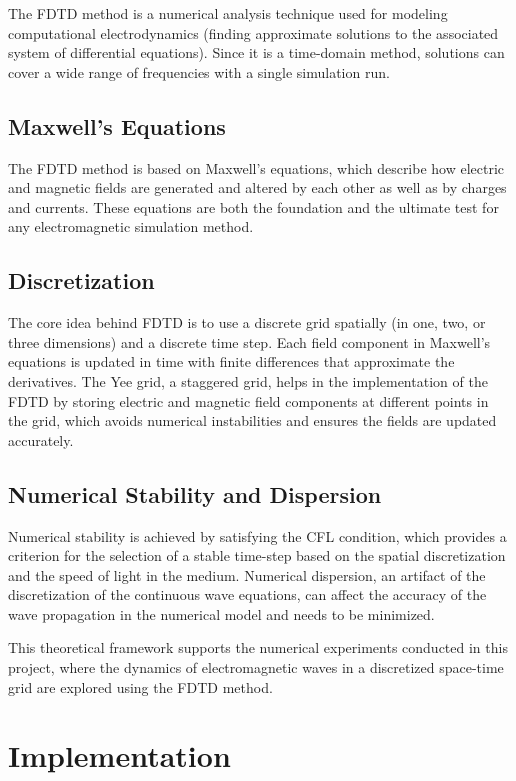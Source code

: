\documentclass{article}[a4paper]
\begin{document}
The FDTD method is a numerical analysis technique used for modeling computational electrodynamics (finding approximate solutions to the associated system of differential equations). Since it is a time-domain method, solutions can cover a wide range of frequencies with a single simulation run.

\subsection{Maxwell's Equations}
The FDTD method is based on Maxwell's equations, which describe how electric and magnetic fields are generated and altered by each other as well as by charges and currents. These equations are both the foundation and the ultimate test for any electromagnetic simulation method.

\subsection{Discretization}
The core idea behind FDTD is to use a discrete grid spatially (in one, two, or three dimensions) and a discrete time step. Each field component in Maxwell's equations is updated in time with finite differences that approximate the derivatives. The Yee grid, a staggered grid, helps in the implementation of the FDTD by storing electric and magnetic field components at different points in the grid, which avoids numerical instabilities and ensures the fields are updated accurately.

\subsection{Numerical Stability and Dispersion}
Numerical stability is achieved by satisfying the CFL condition, which provides a criterion for the selection of a stable time-step based on the spatial discretization and the speed of light in the medium. Numerical dispersion, an artifact of the discretization of the continuous wave equations, can affect the accuracy of the wave propagation in the numerical model and needs to be minimized.

This theoretical framework supports the numerical experiments conducted in this project, where the dynamics of electromagnetic waves in a discretized space-time grid are explored using the FDTD method.

\section{Implementation}
\end{document}

